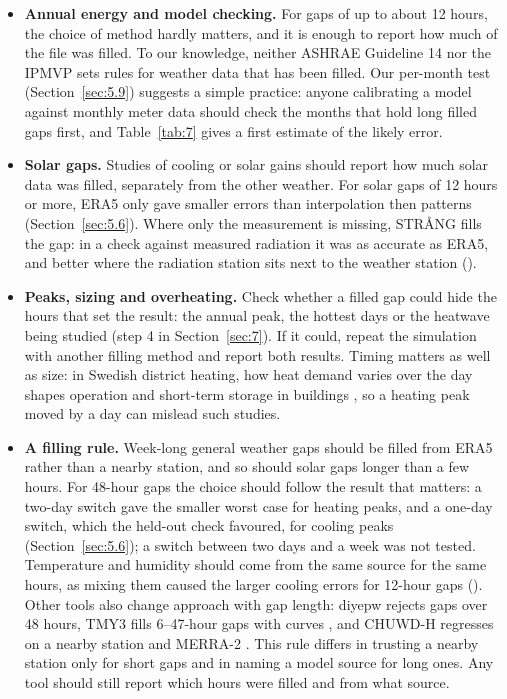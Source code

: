 \begin{itemize}
\item
  \textbf{Annual energy and model checking.} For gaps of up to about 12 hours, the choice of method hardly matters, and it is enough to report how much of the file was filled. To our knowledge, neither ASHRAE Guideline 14 \citep{ashrae2014} nor the IPMVP \citep{evo2022} sets rules for weather data that has been filled. Our per-month test (Section~\ref{sec:5.9}) suggests a simple practice: anyone calibrating a model against monthly meter data should check the months that hold long filled gaps first, and Table~\ref{tab:7} gives a first estimate of the likely error.
\item
  \textbf{Solar gaps.} Studies of cooling or solar gains should report how much solar data was filled, separately from the other weather. For solar gaps of 12 hours or more, ERA5 only gave smaller errors than interpolation then patterns (Section~\ref{sec:5.6}). Where only the measurement is missing, STRÅNG fills the gap: in a check against measured radiation it was as accurate as ERA5, and better where the radiation station sits next to the weather station ().
\item
  \textbf{Peaks, sizing and overheating.} Check whether a filled gap could hide the hours that set the result: the annual peak, the hottest days or the heatwave being studied (step 4 in Section~\ref{sec:7}). If it could, repeat the simulation with another filling method and report both results. Timing matters as well as size: in Swedish district heating, how heat demand varies over the day shapes operation and short-term storage in buildings \citep{gadd2013,kensby2015}, so a heating peak moved by a day can mislead such studies.
\item
  \textbf{A filling rule.} Week-long general weather gaps should be filled from ERA5 rather than a nearby station, and so should solar gaps longer than a few hours. For 48-hour gaps the choice should follow the result that matters: a two-day switch gave the smaller worst case for heating peaks, and a one-day switch, which the held-out check favoured, for cooling peaks (Section~\ref{sec:5.6}); a switch between two days and a week was not tested. Temperature and humidity should come from the same source for the same hours, as mixing them caused the larger cooling errors for 12-hour gaps (). Other tools also change approach with gap length: diyepw rejects gaps over 48 hours, TMY3 fills 6--47-hour gaps with curves \citep{wilcox2008}, and CHUWD-H regresses on a nearby station and MERRA-2 \citep{wang2024}. This rule differs in trusting a nearby station only for short gaps and in naming a model source for long ones. Any tool should still report which hours were filled and from what source.
\end{itemize}

